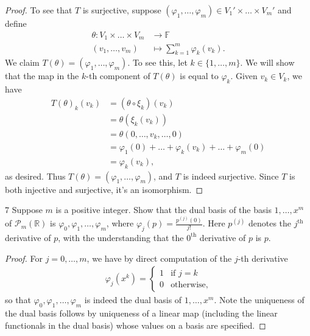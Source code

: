 \documentclass{extarticle}
\newenvironment{problem}[1]{\begin{prob*}{#1}{}}{\end{prob*}}
\newcommand{\R}{\mathbb{R}}
\newcommand{\F}{\mathbb{F}}
\newcommand{\poly}{\mathcal{P}}
\begin{document}
\begin{proof}
\indent To see that $T$ is surjective, suppose $(\varphi_1,\dots,\varphi_m)\in V_1'\times\dots\times V_m'$ and define
\begin{align*}
\theta: V_1\times\dots\times V_m &\to \F\\
(v_1,\dots,v_m)&\mapsto \sum_{k=1}^m\varphi_k(v_k).
\end{align*}
We claim $T(\theta)=(\varphi_1,\dots,\varphi_m)$.  To see this, let $k\in\{1,\dots,m\}$.  We will show that the map in the $k$-th component of $T(\theta)$ is equal to $\varphi_k$.  Given $v_k\in V_k$, we have
\begin{align*}
T(\theta)_k(v_k) &= (\theta\circ\xi_k)(v_k)\\
&=\theta(\xi_k(v_k))\\
&=\theta(0,\dots, v_k, \dots, 0)\\
&= \varphi_1(0) + \dots + \varphi_k(v_k) + \dots + \varphi_m(0)\\
&=\varphi_k(v_k),
\end{align*}
as desired.  Thus $T(\theta) = (\varphi_1,\dots,\varphi_m)$, and $T$ is indeed surjective.  Since $T$ is both injective and surjective, it's an isomorphism.
\end{proof}

\begin{problem}{7}
Suppose $m$ is a positive integer.  Show that the dual basis of the basis $1,\dots, x^m$ of $\poly_m(\R)$ is $\varphi_0,\varphi_1,\dots,\varphi_m$, where $\varphi_j(p)=\frac{p^{(j)}(0)}{j!}$.  Here $p^{(j)}$ denotes the $j^{\text{th}}$ derivative of $p$, with the understanding that the $0^\text{th}$ derivative of $p$ is $p$.
\end{problem}
\begin{proof}
For $j=0,\dots,m$, we have by direct computation of the $j$-th derivative
\begin{align*}
\varphi_j\left(x^k\right) = \begin{cases}1 &\text{if }j = k\\0 &\text{otherwise,}\end{cases}
\end{align*}
so that $\varphi_0,\varphi_1,\dots,\varphi_m$ is indeed the dual basis of $1,\dots, x^m$.  Note the uniqueness of the dual basis follows by uniqueness of a linear map (including the linear functionals in the dual basis) whose values on a basis are specified.
\end{proof}
\end{document}
